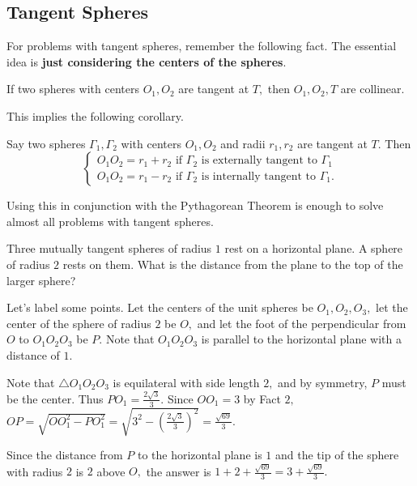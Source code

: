 \subsection{Tangent Spheres}
For problems with tangent spheres, remember the following fact. The essential idea is \textbf{just considering the centers of the spheres}.
\begin{fact}
If two spheres with centers $O_1,O_2$ are tangent at $T,$ then $O_1,O_2,T$ are collinear.
\end{fact}
This implies the following corollary.
\begin{fact}
Say two spheres $\Gamma_1,\Gamma_2$ with centers $O_1,O_2$ and radii $r_1,r_2$ are tangent at $T.$ Then
\[\begin{cases}
O_1O_2=r_1+r_2 \text{ if } \Gamma_2 \text{ is externally tangent to } \Gamma_1 \\
O_1O_2=r_1-r_2 \text{ if } \Gamma_2 \text{ is internally tangent to } \Gamma_1.
\end{cases}\]
\end{fact}
Using this in conjunction with the Pythagorean Theorem is enough to solve almost all problems with tangent spheres.
\begin{exam}[AMC 12A 2004/22]
Three mutually tangent spheres of radius $1$ rest on a horizontal plane. A sphere of radius $2$ rests on them. What is the distance from the plane to the top of the larger sphere?
\end{exam}
\begin{sol}
Let's label some points. Let the centers of the unit spheres be $O_1,O_2,O_3,$ let the center of the sphere of radius $2$ be $O,$ and let the foot of the perpendicular from $O$ to $O_1O_2O_3$ be $P.$ Note that $O_1O_2O_3$ is parallel to the horizontal plane with a distance of $1.$

Note that $\triangle O_1O_2O_3$ is equilateral with side length $2,$ and by symmetry, $P$ must be the center. Thus $PO_1=\frac{2\sqrt{3}}{3}.$ Since $OO_1=3$ by Fact $2,$ $OP=\sqrt{OO_1^2-PO_1^2}=\sqrt{3^2-(\frac{2\sqrt{3}}{3})^2}=\frac{\sqrt{69}}{3}.$

Since the distance from $P$ to the horizontal plane is $1$ and the tip of the sphere with radius $2$ is $2$ above $O,$ the answer is $1+2+\frac{\sqrt{69}}{3}=3+\frac{\sqrt{69}}{3}.$
\begin{center}
\end{center}
\end{sol}
